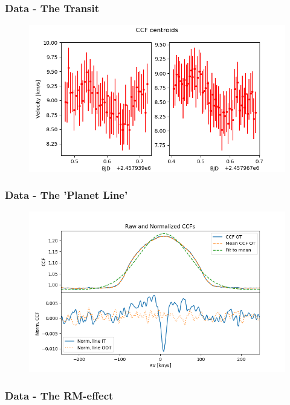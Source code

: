 \documentclass[show notes]{beamer}
\begin{document}
\begin{frame}
\frametitle{Data - The Transit}
\begin{figure}
	\centering
	\includegraphics[width=\textwidth]{../figures/ccf_centroids.png}
	\label{fig:CCF_cent}
\end{figure}
\end{frame}

\begin{frame}
\frametitle{Data - The 'Planet Line'}
\begin{figure}
	\centering
	\includegraphics[width=\textwidth]{../figures/ccfs_norm.png}
	\label{fig:CCFs_norm}
\end{figure}
\end{frame}

\begin{frame}
\frametitle{Data - The RM-effect}
	\begin{figure}
	\centering
	\label{fig:colormap}
\end{figure}
\end{frame}
\end{document}
